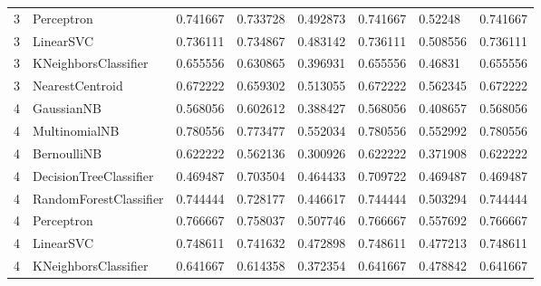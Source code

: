 \documentclass{article}
\begin{document}
\begin{table}[h]
\begin{tabular}{llllllll}
3             & Perceptron             & 0.741667          & 0.733728          & 0.492873              & 0.741667              & 0.52248                  & 0.741667                 \\
3             & LinearSVC              & 0.736111          & 0.734867          & 0.483142              & 0.736111              & 0.508556                 & 0.736111                 \\
3             & KNeighborsClassifier   & 0.655556          & 0.630865          & 0.396931              & 0.655556              & 0.46831                  & 0.655556                 \\
3             & NearestCentroid        & 0.672222          & 0.659302          & 0.513055              & 0.672222              & 0.562345                 & 0.672222                 \\
4             & GaussianNB             & 0.568056          & 0.602612          & 0.388427              & 0.568056              & 0.408657                 & 0.568056                 \\
4             & MultinomialNB          & 0.780556          & 0.773477          & 0.552034              & 0.780556              & 0.552992                 & 0.780556                 \\
4             & BernoulliNB            & 0.622222          & 0.562136          & 0.300926              & 0.622222              & 0.371908                 & 0.622222                 \\
4             & DecisionTreeClassifier & 0.469487          & 0.703504          & 0.464433              & 0.709722              & 0.469487                 & 0.469487                 \\
4             & RandomForestClassifier & 0.744444          & 0.728177          & 0.446617              & 0.744444              & 0.503294                 & 0.744444                 \\
4             & Perceptron             & 0.766667          & 0.758037          & 0.507746              & 0.766667              & 0.557692                 & 0.766667                 \\
4             & LinearSVC              & 0.748611          & 0.741632          & 0.472898              & 0.748611              & 0.477213                 & 0.748611                 \\
4             & KNeighborsClassifier   & 0.641667          & 0.614358          & 0.372354              & 0.641667              & 0.478842                 & 0.641667                 \\

\end{tabular}
\end{table}
\end{document}
